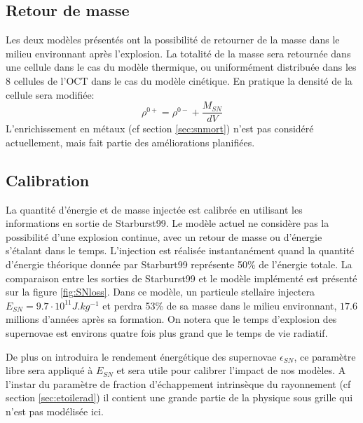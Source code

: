 \subsection{Retour de masse}
Les deux modèles présentés ont la possibilité de retourner de la masse dans le milieu environnant après l'explosion.
La totalité de la masse sera retournée dans une cellule dans le cas du modèle thermique, ou uniformément distribuée dans les 8 cellules de l'OCT dans le cas du modèle cinétique.
En pratique la densité de la cellule sera modifiée:
\begin{equation}
\rho^{0+} = \rho^{0-} + \frac{M_{SN}}{dV}
\end{equation}
L’enrichissement en métaux (cf section \ref{sec:snmort}) n'est pas considéré actuellement, mais fait partie des améliorations planifiées.

\subsection{Calibration}
\label{sec:sncali}
La quantité d'énergie et de masse injectée est calibrée en utilisant les informations en sortie de Starburst99.
Le modèle actuel ne considère pas la possibilité d'une explosion continue, avec un retour de masse ou d'énergie s'étalant dans le temps.
L'injection est réalisée instantanément quand la quantité d’énergie théorique donnée par Starburt99 représente 50\% de l’énergie totale.
La comparaison entre les sorties de Starburst99 et le modèle implémenté est présenté sur la figure \ref{fig:SNloss}.
Dans ce modèle, un particule stellaire injectera $E_{SN} = 9.7\cdot 10^{11} J.kg^{-1}$ et perdra 53\% de sa masse dans le milieu environnant, $17.6$ millions d'années après sa formation.
On notera que le temps d'explosion des supernovae est environs quatre fois plus grand que le temps de vie radiatif.

De plus on introduira le rendement énergétique des supernovae $\epsilon_{SN}$, ce paramètre libre sera appliqué à $E_{SN}$ et sera utile pour calibrer l'impact de nos modèles.
A l'instar du paramètre de fraction d'échappement intrinsèque du rayonnement (cf section \ref{sec:etoilerad}) il contient une grande partie de la physique sous grille qui n'est pas modélisée ici.

